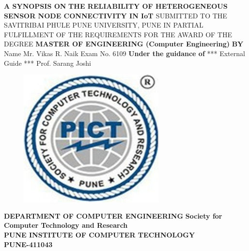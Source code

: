 \documentclass[a4paper, 12pt, notitlepage]{article}
\begin{document}
\begin{titlepage}
\begin{center}
\textbf {A SYNOPSIS ON}
\linebreak 
\linebreak 
\textbf {\Large{THE RELIABILITY OF HETEROGENEOUS SENSOR NODE CONNECTIVITY IN IoT }}
\linebreak
\linebreak
SUBMITTED TO THE SAVITRIBAI PHULE PUNE UNIVERSITY, 
PUNE IN PARTIAL FULFILLMENT OF THE REQUIREMENTS 
FOR THE AWARD OF THE DEGREE
\linebreak
\linebreak
\textbf{\large{MASTER OF ENGINEERING (Computer Engineering)}}
\linebreak
\textbf{\large{BY}}
\linebreak
\large{Name Mr. Vikas R. Naik  \hspace{10mm}   Exam No. 6109}
\linebreak
\linebreak
\textbf{\large{Under the guidance of}}
\linebreak
\Large{*** External Guide ***     \hspace{10mm}     Prof. Sarang Joshi}
\linebreak
\begin{figure}[ht!]
\begin{center}
\includegraphics[scale=0.3]{pict.png}
\end{center}
\label{overflow}
\end{figure}
\textbf{\linebreak \large{DEPARTMENT OF COMPUTER ENGINEERING}}
\linebreak
\textbf{Society for Computer Technology and Research}\\
\textbf{PUNE INSTITUTE OF COMPUTER TECHNOLOGY}\\
\textbf{PUNE-411043} \\
\end{center}
\end{titlepage}
\pagebreak
\end{document}
